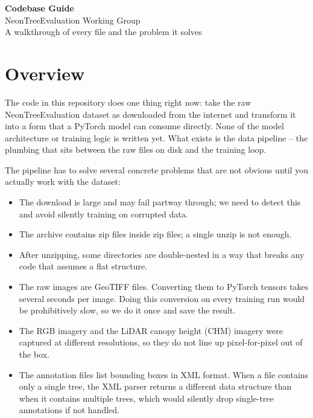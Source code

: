 \documentclass[11pt, a4paper]{article}
\begin{document}
\begin{center}
  {\LARGE\bfseries Codebase Guide}\\[0.4em]
  {\large NeonTreeEvaluation Working Group}\\[0.2em]
  {\normalsize\color{gray} A walkthrough of every file and the problem it solves}
\end{center}

\vspace{1em}
\tableofcontents
\vspace{1em}

\section{Overview}

The code in this repository does one thing right now: take the raw
NeonTreeEvaluation dataset as downloaded from the internet and transform it
into a form that a PyTorch model can consume directly. None of the model
architecture or training logic is written yet. What exists is the data
pipeline -- the plumbing that sits between the raw files on disk and the
training loop.

The pipeline has to solve several concrete problems that are not obvious until
you actually work with the dataset:

\begin{itemize}[nosep]
  \item The download is large and may fail partway through; we need to detect
        this and avoid silently training on corrupted data.
  \item The archive contains zip files inside zip files; a single unzip is not
        enough.
  \item After unzipping, some directories are double-nested in a way that
        breaks any code that assumes a flat structure.
  \item The raw images are GeoTIFF files. Converting them to PyTorch tensors
        takes several seconds per image. Doing this conversion on every training
        run would be prohibitively slow, so we do it once and save the result.
  \item The RGB imagery and the LiDAR canopy height (CHM) imagery were captured
        at different resolutions, so they do not line up pixel-for-pixel out of
        the box.
  \item The annotation files list bounding boxes in XML format. When a file
        contains only a single tree, the XML parser returns a different data
        structure than when it contains multiple trees, which would silently
        drop single-tree annotations if not handled.
\end{itemize}
\end{document}

